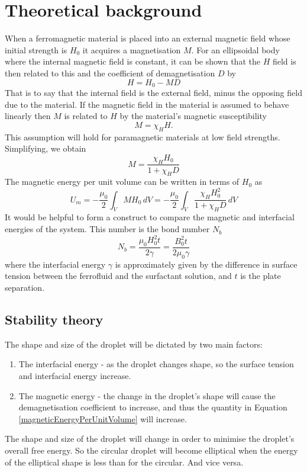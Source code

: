 \documentclass[12pt]{article}
\begin{document}
\section{Theoretical background}
When a ferromagnetic material is placed into an external magnetic field whose initial strength is $H_0$ it acquires a magnetisation $M$. For an ellipsoidal body where the internal magnetic field is constant, it can be shown that the $H$ field is then related to this and the coefficient of demagnetisation $D$ by 
\begin{equation}
H=H_0-MD
\end{equation}
That is to say that the internal field is the external field, minus the opposing field due to the material. If the magnetic field in the material is assumed to behave linearly then $M$ is related to $H$ by the material's magnetic susceptibility
\begin{equation}
M=\chi_H H.
\end{equation}
This assumption will hold for paramagnetic materials at low field strengths. Simplifying, we obtain 
\begin{equation}
M=\frac{\chi_H H_0}{1+\chi_H D}
\end{equation}
The magnetic energy per unit volume can be written in terms of $H_0$ as
\begin{equation} \label{magneticEnergyPerUnitVolume}
U_m=-\frac{\mu_0}{2}\int_V MH_0 \,dV=-\frac{\mu_0}{2}\int_V \frac{\chi_H H_0^2}{1+\chi_H D} \,dV
\end{equation}
It would be helpful to form a construct to compare the magnetic and interfacial energies of the system. This number is the bond number $N_b$
\begin{equation}
N_b=\frac{\mu_0 H_0^2 t}{2\gamma}=\frac{B_0^2 t}{2\mu_0 \gamma}
\end{equation}
where the interfacial energy $\gamma$ is approximately given by the difference in surface tension between the ferrofluid and the surfactant solution, and $t$ is the plate separation.

\subsection{Stability theory}
The shape and size of the droplet will be dictated by two main factors:
\begin{enumerate}
  \item The interfacial energy - as the droplet changes shape, so the surface tension and interfacial energy increase.
  \item The magnetic energy - the change in the droplet's shape will cause the demagnetisation coefficient to increase, and thus the quantity in Equation \ref{magneticEnergyPerUnitVolume} will increase.
\end{enumerate}
The shape and size of the droplet will change in order to minimise the droplet's overall free energy. So the circular droplet will become elliptical when the energy of the elliptical shape is less than for the circular. And vice versa.
\end{document}
